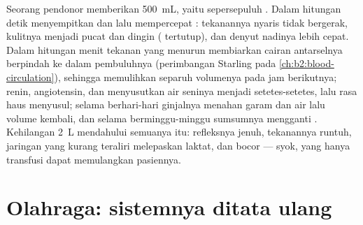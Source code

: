 \begin{example}\label{ex:b2:blood-pressure:haemorrhage}
Seorang pendonor memberikan \qty{500}{mL}, yaitu sepersepuluh .
Dalam hitungan detik  menyempitkan  dan 
lalu mempercepat : tekanannya nyaris tidak bergerak, kulitnya
menjadi pucat dan dingin ( tertutup), dan denyut nadinya
lebih cepat. Dalam hitungan menit tekanan  yang menurun
membiarkan cairan antarselnya berpindah ke dalam pembuluhnya
(perimbangan Starling pada \cref{ch:b2:blood-circulation}), sehingga
memulihkan separuh volumenya pada jam berikutnya; renin, angiotensin,
dan  menyusutkan air seninya menjadi setetes-setetes,
lalu rasa haus menyusul; selama berhari-hari ginjalnya menahan garam
dan air lalu volume  kembali, dan selama berminggu-minggu
sumsumnya mengganti . Kehilangan \qty{2}{L}
mendahului semuanya itu: refleksnya jenuh, tekanannya runtuh, jaringan
yang kurang teraliri melepaskan laktat, dan  bocor --- syok,
yang hanya transfusi dapat memulangkan pasiennya.
\end{example}

\section{Olahraga: sistemnya ditata ulang}

